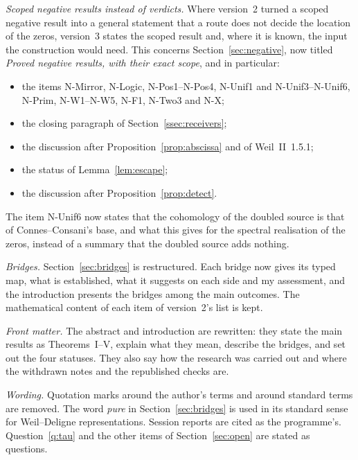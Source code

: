 \emph{Scoped negative results instead of verdicts.} Where version~2 turned a scoped negative result into a general statement that a route does not decide the location of the zeros, version~3 states the scoped result and, where it is known, the input the construction would need. This concerns Section~\ref{sec:negative}, now titled \emph{Proved negative results, with their exact scope}, and in particular:
\begin{itemize}
\item the items N-Mirror, N-Logic, N-Pos1--N-Pos4, N-Unif1 and N-Unif3--N-Unif6, N-Prim, N-W1--N-W5, N-F1, N-Two3 and N-X;
\item the closing paragraph of Section~\ref{ssec:receivers};
\item the discussion after Proposition~\ref{prop:abscissa} and of Weil~II~1.5.1;
\item the status of Lemma~\ref{lem:escape};
\item the discussion after Proposition~\ref{prop:detect}.
\end{itemize}
The item N-Unif6 now states that the cohomology of the doubled source is that of Connes--Consani's base, and what this gives for the spectral realisation of the zeros, instead of a summary that the doubled source adds nothing.

\emph{Bridges.} Section~\ref{sec:bridges} is restructured. Each bridge now gives its typed map, what is established, what it suggests on each side and my assessment, and the introduction presents the bridges among the main outcomes. The mathematical content of each item of version~2's list is kept.

\emph{Front matter.} The abstract and introduction are rewritten: they state the main results as Theorems~I--V, explain what they mean, describe the bridges, and set out the four statuses. They also say how the research was carried out and where the withdrawn notes and the republished checks are.

\emph{Wording.} Quotation marks around the author's terms and around standard terms are removed. The word \emph{pure} in Section~\ref{sec:bridges} is used in its standard sense for Weil--Deligne representations. Session reports are cited as the programme's. Question~\ref{q:tau} and the other items of Section~\ref{sec:open} are stated as questions.

